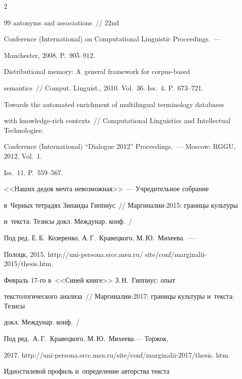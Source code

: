 \begin{multicols}{2}
{{\begin{thebibliography}{99}
antonyms and associations~// 22nd 


Conference (International) on Computational Linguistic Proceedings.~--- 


Manchester, 2008. P.~905--912.







 Distributional memory: A~general framework for corpus-based 


semantics~// Comput. Linguist., 2010. Vol.~36. Iss.~4. P.~673--721.







 Towards the automated enrichment of multilingual terminology databases 


with knowledge-rich contexts~// Computational Linguistics and Intellectual Technologies: 


Conference (International) ``Dialogue 2012'' Proceedings.~---  Moscow: RGGU, 2012. Vol.~1. 


Iss.~11. P.~559--567. 




 <<Наших дедов мечта невозможная>>~--- Учредительное собрание 


в~Черных тетрадях Зинаиды Гиппиус~// Мар\-ги\-на\-лии-2015: границы культуры 


и~текста: Тезисы докл. Междунар. конф.~/


Под ред. Е.\,Б.~Козеренко, А.\,Г.~Кравецкого, М.\,Ю.~Ми\-хе\-ева.~--- 


Полоцк, 2015. {\sf http://uni-persona.srcc.msu.ru/ site/conf/marginalii-2015/thesis.htm}.




 Февраль 17-го в~<<Синей книге>> З.\,Н.~Гиппиус: опыт 


текстологического анализа~// Мар\-ги\-на\-лии-2017: границы культуры и~текста: Тезисы 


докл. Междунар. конф.~/


Под ред.\ А.\,Г.~Кра\-вец\-ко\-го, М.\,Ю.~Ми\-хе\-ева.--- Торжок, 


2017. {\sf http://uni-\linebreak persona.srcc.msu.ru/site/conf/marginalii-2017/thesis. htm}.




 Идиостилевой профиль и~определение авторства текста 



\end{thebibliography}}}
\end{multicols}
